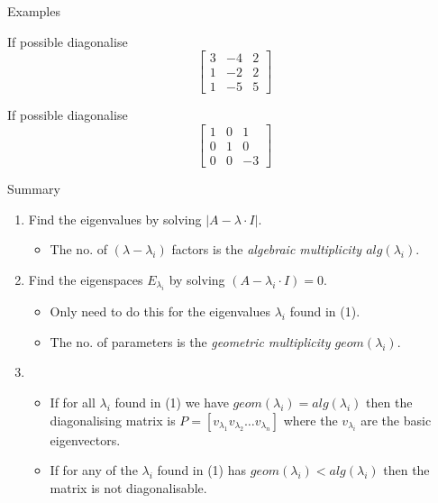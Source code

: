 \documentclass{beamer}
\begin{document}
\begin{frame}{Examples}
\begin{example}
If possible diagonalise
\[
\left[
\begin{matrix}
3&-4&2\\
1&-2&2\\
1&-5&5
\end{matrix}
\right]\]
\end{example}
\begin{example}
If possible diagonalise
\[
\left[
\begin{matrix}
1&0&1\\
0&1&0\\
0&0&-3
\end{matrix}
\right]\]
\end{example}
\end{frame}


\begin{frame}{Summary}
\begin{enumerate}
	\item Find the eigenvalues by solving $\left|A-\lambda\cdot I\right|$.
	\begin{itemize}
		\item The no. of $(\lambda - \lambda_i)$ factors is the \emph{algebraic multiplicity $alg(\lambda_i)$}.
	\end{itemize}
	\vfill
	\item Find the eigenspaces $E_{\lambda_i}$ by solving $(A-\lambda_i\cdot I) = 0$.
	\begin{itemize}
		\item Only need to do this for the eigenvalues $\lambda_i$ found in (1).
		\item The no. of parameters is the \emph{geometric multiplicity $geom(\lambda_i)$}.
	\end{itemize}\vfill
	\item 
	\begin{itemize}
		\item If for all $\lambda_i$ found in (1) we have $geom(\lambda_i) = alg(\lambda_i)$
		then the diagonalising matrix is $P= \left[v_{\lambda_1} v_{\lambda_2} \dots v_{\lambda_n}\right]$
		where the $v_{\lambda_i}$ are the basic eigenvectors.
		\item If for any of the $\lambda_i$ found in (1) has $geom(\lambda_i) < alg(\lambda_i)$
		then the matrix is not diagonalisable.
	\end{itemize}
\end{enumerate}
\end{frame}
\end{document}
